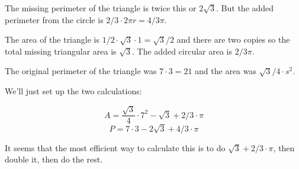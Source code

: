 \documentclass[11pt, oneside]{article}
\begin{document}
The missing perimeter of the triangle is twice this or $2 \sqrt{3}$.  But the added perimeter from the circle is $2/3 \cdot 2 \pi r = 4/3 \pi$.

The area of the triangle is $1/2 \cdot \sqrt{3} \cdot 1 = \sqrt{3}/2$ and there are two copies so the total missing triangular area is $\sqrt{3}$.  The added circular area is $2/3 \pi$. 

The original perimeter of the triangle was $7 \cdot 3 = 21$ and the area was $\sqrt{3}/4 \cdot s^2$.

We'll just set up the two calculations:

\[ A = \frac{\sqrt{3}}{4} \cdot 7^2 - \sqrt{3} + 2/3 \cdot \pi \]
\[ P = 7 \cdot 3 - 2 \sqrt{3} + 4/3 \cdot \pi \]

It seems that the most efficient way to calculate this is to do $ \sqrt{3} + 2/3 \cdot \pi$, then double it, then do the rest.
\end{document}
